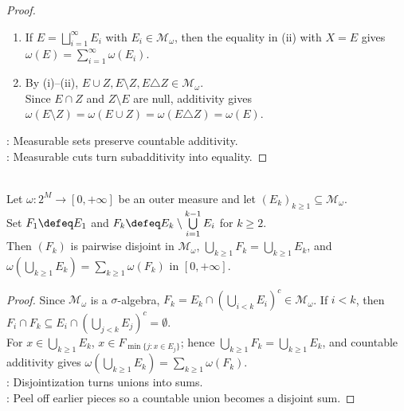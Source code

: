 \begin{theorem}
\begin{proof}
\begin{enumerate}[label=(\roman*)]
For pairwise disjoint $E_i\in\mathcal{M}_\omega$, set $E=\bigsqcup_iE_i$ and $F_N=(\bigcup_{i=1}^{N}E_i)^c$.\\
Finite splitting gives $\omega(X)\geq\sum_{i=1}^{N}\omega(X\cap E_i)+\omega(X\cap E^c)$ for every $N$.\\
Letting $N\to\infty$ and using subadditivity gives $\omega(X)=\sum_{i=1}^{\infty}\omega(X\cap E_i)+\omega(X\cap E^c)$.\\
Since $\omega(X\cap E)\leq\sum_i\omega(X\cap E_i)$ and $\omega(X)\leq\omega(X\cap E)+\omega(X\cap E^c)$, $E\in\mathcal{M}_\omega$.\\
General countable unions follow from $H_1=E_1$ and $H_n=E_n\setminus\bigcup_{i<n}E_i$.
\item If $E=\bigsqcup_{i=1}^{\infty}E_i$ with $E_i\in\mathcal{M}_\omega$, then the equality in (ii) with $X=E$ gives $\omega(E)=\sum_{i=1}^{\infty}\omega(E_i)$.
\item By (i)--(ii), $E\cup Z,E\setminus Z,E\triangle Z\in\mathcal{M}_\omega$.\\
Since $E\cap Z$ and $Z\setminus E$ are null, additivity gives $\omega(E\setminus Z)=\omega(E\cup Z)=\omega(E\triangle Z)=\omega(E)$.
\end{enumerate}
: Measurable sets preserve countable additivity.\\
: Measurable cuts turn subadditivity into equality.
\end{proof}
\end{theorem}

\begin{corollary} \label{cor:caratheodory-disjointization-countable-additivity} \\
Let $\omega:2^M\to[0,+\infty]$ be an outer measure and let $(E_k)_{k\geq1}\subseteq\mathcal{M}_\omega$.\\
Set $F_1\defeq E_1$ and $F_k\defeq E_k\setminus\bigcup\limits_{i=1}^{k-1}E_i$ for $k\geq2$.\\
Then $(F_k)$ is pairwise disjoint in $\mathcal{M}_\omega$, $\bigcup\limits_{k\geq1}F_k=\bigcup\limits_{k\geq1}E_k$, and $\omega(\bigcup\limits_{k\geq1}E_k)=\sum\limits_{k\geq1}\omega(F_k)$ in $[0,+\infty]$.
\begin{proof}
Since $\mathcal{M}_\omega$ is a $\sigma$-algebra, $F_k=E_k\cap(\bigcup\limits_{i<k}E_i)^c\in\mathcal{M}_\omega$. If $i<k$, then $F_i\cap F_k\subseteq E_i\cap(\bigcup\limits_{j<k}E_j)^c=\emptyset$.\\
For $x\in\bigcup\limits_{k\geq1}E_k$, $x\in F_{\min\{j:x\in E_j\}}$; hence $\bigcup\limits_{k\geq1}F_k=\bigcup\limits_{k\geq1}E_k$, and countable additivity gives $\omega(\bigcup\limits_{k\geq1}E_k)=\sum\limits_{k\geq1}\omega(F_k)$.\\
: Disjointization turns unions into sums.\\
: Peel off earlier pieces so a countable union becomes a disjoint sum.
\end{proof}
\end{corollary}

